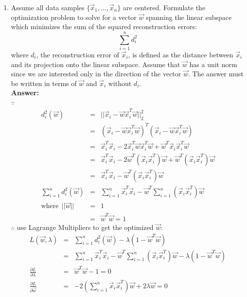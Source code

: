 \documentclass[letterpaper,10pt]{article}
\begin{document}
\begin{enumerate}
\item Assume all data samples $\{\vec{x}_1,\dots,\vec{x}_n\}$ are centered. Formulate the optimization problem to solve for a vector $\vec{w}$ spanning the linear subspace which minimizes the sum of the squared reconstruction errors:
$$\sum_{i=1}^{n}{d_i^2}$$
where $d_i$, the reconstruction error of $\vec{x}_i$, is defined as the distance between $\vec{x}_i$ and its projection onto the linear subspace. Assume that $\vec{w}$ has a unit norm since we are interested only in the direction of the vector $\vec{w}$. The answer must be written in terms of $\vec{w}$ and $\vec{x}_i$ without $d_i$.\\
\textbf{Answer:}\\
$\because$
\begin{equation}
\nonumber
\begin{array}{rcl}
d_i^2(\vec{w}) & = & ||\vec{x}_i-\vec{w}\vec{x}_i^T\vec{w}||_2^2 \\
 & = & (\vec{x}_i-\vec{w}\vec{x}_i^T\vec{w})^T(\vec{x}_i-\vec{w}\vec{x}_i^T\vec{w}) \\
 & = & \vec{x}_i^T\vec{x}_i-2\vec{x}_i^T\vec{w}\vec{x}_i^T\vec{w}+\vec{w}^T\vec{x}_i\vec{x}_i^T\vec{w}\\
 & = & \vec{x}_i^T\vec{x}_i-2\vec{w}^T(\vec{x}_i\vec{x}_i^T)\vec{w}+\vec{w}^T(\vec{x}_i\vec{x}_i^T)\vec{w}\\
 & = & \vec{x}_i^T\vec{x}_i-\vec{w}^T(\vec{x}_i\vec{x}_i^T)\vec{w}\\
 \sum_{i=1}^{n}{d_i^2(\vec{w})} & = & \sum_{i=1}^{n}{\vec{x}_i^T\vec{x}_i}-\vec{w}^T\sum_{i=1}^{n}{(\vec{x}_i\vec{x}_i^T)}\vec{w} \\
 \text{where}~~||\vec{w}|| & = & 1 \\
 & = & \vec{w}^T\vec{w}=1 
\end{array}
\end{equation}
$\therefore$ use Lagrange Multipliers to get the optimized $\vec{w}$:
\begin{equation}
\nonumber
\begin{array}{rcl}
L(\vec{w},\lambda) & = & \sum_{i=1}^{n}{d_i^2(\vec{w})} - \lambda(1-\vec{w}^T\vec{w}) \\
 & = & \sum_{i=1}^{n}{\vec{x}_i^T\vec{x}_i}-\vec{w}^T\sum_{i=1}^{n}{(\vec{x}_i\vec{x}_i^T)}\vec{w} - \lambda(1-\vec{w}^T\vec{w}) \\
 \frac{\partial L}{\partial \lambda} & = & \vec{w}^T\vec{w}-1 = 0 \\
 \frac{\partial L}{\partial \vec{w}} & = & -2(\sum_{i=1}^{n}{\vec{x}_i\vec{x}_i^T})\vec{w}+2\lambda\vec{w} = 0\\

\end{array}
\end{equation}
\end{enumerate}
\end{document}
